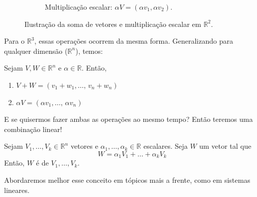 \documentclass[../main.tex]{subfiles}
\begin{document}
\begin{figure}[h]
\begin{subfigure}[t]{0.48\textwidth}
				\caption{Multiplicação escalar: $\alpha V=(\alpha v_1,\alpha v_2)$.}
			\end{subfigure}
			
			\caption{Ilustração da soma de vetores e multiplicação escalar em $\mathbb{R}^2$.}
		\end{figure}
		
		Para o $\mathbb{R}^3$, essas operações ocorrem da mesma forma. Generalizando para qualquer dimensão ($\mathbb{R}^n$), temos:
		
		\begin{proposicao}
			Sejam $V, W\in \mathbb{R}^n$ e $\alpha\in \mathbb{R}$. Então,
			\begin{enumerate}[label = \roman*)]
				\item $V+W = (v_1+w_1,\dots, \, v_n+w_n)$
				\item $\alpha V = (\alpha v_1,\dots ,\, \alpha v_n)$
			\end{enumerate} 
		\end{proposicao}
		E se quisermos fazer ambas as operações ao mesmo tempo? Então teremos uma combinação linear!
		\begin{definicao}
			Sejam $V_1, \dots, V_k \in \mathbb{R}^n$ vetores e $\alpha_1,\dots, \alpha_k \in \mathbb{R}$ escalares. Seja $W$ um vetor tal que
			\[
			W = \alpha_1 V_1 + \dots + \alpha_k V_k 
			\]
			Então, $W$ é  de $V_1, \dots, V_k$.
		\end{definicao}
		Abordaremos melhor esse conceito em tópicos mais a frente, como em sistemas lineares.
		
\end{document}
